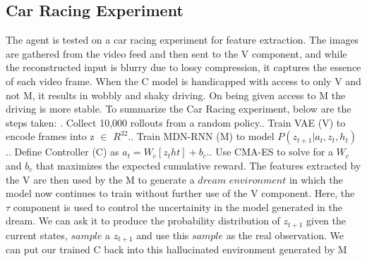 \documentclass[a4paper]{article}
\begin{document}
\subsection{Car Racing Experiment}
The agent is tested on a car racing experiment for feature extraction. The images are gathered from the video feed and then sent to the V component, and while the reconstructed input is blurry due to lossy compression, it captures the essence of each video frame. When the C model is handicapped with access to only V and not M, it results in wobbly and shaky driving. On being given access to M the driving is more stable.
\newline
\newline
To summarize the Car Racing experiment, below are the steps taken:
\newline{}. Collect 10,000 rollouts from a random policy.\newline{}. Train VAE (V) to encode frames into z $\in$ $R^{32}$.\newline{}. Train MDN-RNN (M) to model $P(z_{t+1} | a_t, z_t, h_t)$.\newline{}. Define Controller (C) as $a_t = W_c[z_t ht] + b_c$.\newline{}. Use CMA-ES to solve for a $W_c$ and $b_c$ that maximizes the expected cumulative reward.\newline
\newline
The features extracted by the V are then used by the M to generate a $dream$ $environment$ in which the model now continues to train without further use of the V component. Here, the $\tau$ component is used to control the uncertainity in the model generated in the dream. We can ask it to produce the probability distribution of $z_{t+1}$ given the current states, $sample$ a $z_{t+1}$ and use this $sample$ as the real observation. We can put our trained C back into this hallucinated environment generated by M
\newline
\newline
\newline
\newline
\newline
\newline
\end{document}
